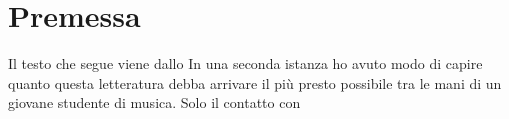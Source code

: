 

\chapter*{Premessa}

Il testo che segue viene dallo 
In una seconda istanza ho avuto modo di capire quanto questa letteratura debba arrivare il più presto possibile tra le mani di un giovane studente di musica. Solo il contatto con
